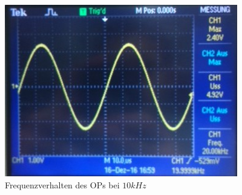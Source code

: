 \begin{figure}[!ht]
\begin{center}
\includegraphics[scale=0.8]{bild/image1}
\caption{Frequenzverhalten des OPs bei $10kHz$}
\end{center}
\end{figure}
\begin{figure}
\end{figure}

